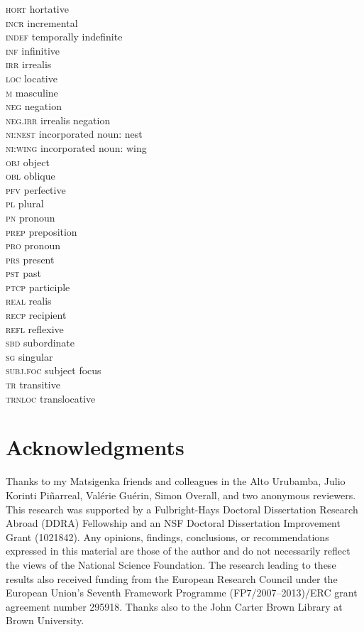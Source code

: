 \documentclass[output=paper]{LSP/langsci}
\begin{document}
\begin{multicols}{2}
\begin{tabbing}
\textsc{hort} \>  hortative\\
\textsc{incr} \>  incremental\\
\textsc{indef} \>  temporally indefinite\\
\textsc{inf} \>  infinitive\\
\textsc{irr} \>  irrealis\\
\textsc{loc} \>  locative\\
\textsc{m} \>  masculine\\
\textsc{neg} \>  negation\\
\textsc{neg.irr} \> irrealis negation\\
\textsc{ni:nest} \>   incorporated noun: nest\\
\textsc{ni:wing} \>    incorporated noun: wing\\
\textsc{obj} \>  object\\
\textsc{obl} \>  oblique\\
\textsc{pfv} \>  perfective\\
\textsc{pl} \>  plural\\
\textsc{pn} \>  pronoun\\
\textsc{prep} \>  preposition\\
\textsc{pro} \>  pronoun\\
\textsc{prs} \>  present\\
\textsc{pst} \>  past\\
\textsc{ptcp} \>  participle\\
\textsc{real} \>  realis\\
\textsc{recp} \>  recipient\\
\textsc{refl} \>  reflexive\\
\textsc{sbd} \>  subordinate\\
\textsc{sg} \>  singular\\
\textsc{subj.foc}  \>  subject focus\\
\textsc{tr} \>  transitive\\
\textsc{trnloc} \> translocative
\end{tabbing}
\end{multicols}

\section*{Acknowledgments}
Thanks to my Matsigenka friends and colleagues in the {Alto Urubamba}, Julio Korinti Piñarreal, Valérie Guérin, Simon Overall, and two anonymous reviewers. This research was supported by a Fulbright-Hays Doctoral Dissertation Research Abroad (DDRA) Fellowship and an NSF Doctoral Dissertation Improvement Grant (1021842). Any opinions, findings, conclusions, or recommendations expressed in this material are those of the author and do not necessarily reflect the views of the National Science Foundation. The research leading to these results also received funding from the European Research Council under the European Union’s Seventh Framework Programme (FP7/2007–2013)/ERC grant agreement number 295918. Thanks also to the John Carter Brown Library at Brown University.
%

\sloppy

\printbibliography[heading=subbibliography,notkeyword=this] 
\end{document}
